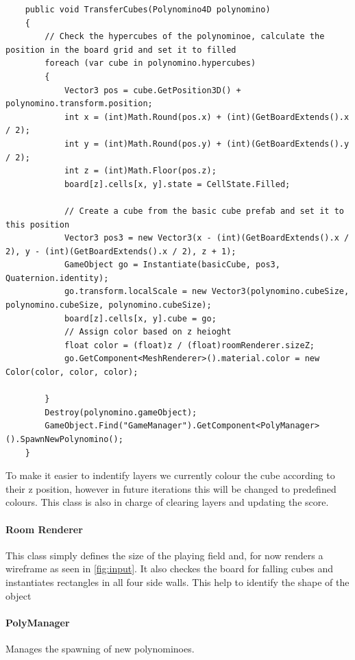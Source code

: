 \documentclass{article}
\begin{document}
\begin{verbatim}
    public void TransferCubes(Polynomino4D polynomino)
    {
        // Check the hypercubes of the polynominoe, calculate the position in the board grid and set it to filled
        foreach (var cube in polynomino.hypercubes)
        {
            Vector3 pos = cube.GetPosition3D() + polynomino.transform.position;
            int x = (int)Math.Round(pos.x) + (int)(GetBoardExtends().x / 2);
            int y = (int)Math.Round(pos.y) + (int)(GetBoardExtends().y / 2);
            int z = (int)Math.Floor(pos.z);
            board[z].cells[x, y].state = CellState.Filled;
 
            // Create a cube from the basic cube prefab and set it to this position
            Vector3 pos3 = new Vector3(x - (int)(GetBoardExtends().x / 2), y - (int)(GetBoardExtends().x / 2), z + 1);
            GameObject go = Instantiate(basicCube, pos3, Quaternion.identity);
            go.transform.localScale = new Vector3(polynomino.cubeSize, polynomino.cubeSize, polynomino.cubeSize);
            board[z].cells[x, y].cube = go;
            // Assign color based on z heioght
            float color = (float)z / (float)roomRenderer.sizeZ;
            go.GetComponent<MeshRenderer>().material.color = new Color(color, color, color);
 
        }
        Destroy(polynomino.gameObject);
        GameObject.Find("GameManager").GetComponent<PolyManager>().SpawnNewPolynomino();
    }
\end{verbatim}
To make it easier to indentify layers we currently colour the cube according to their z position, however in future iterations this will be changed to predefined colours.
This class is also in charge of clearing layers and updating the score. 

\paragraph{Room Renderer}
This class simply defines the size of the playing field and, for now renders a wireframe as seen in \ref{fig:input}. It also checkes the board for falling cubes and instantiates rectangles in all four side walls. This help to identify the shape of the object 

\paragraph{PolyManager}
Manages the spawning of new polynominoes. 
\end{document}
